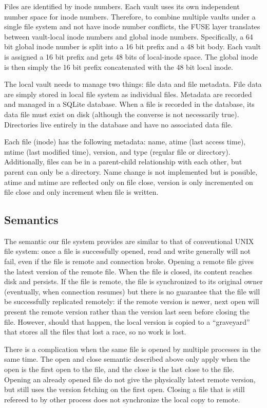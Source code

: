 \documentclass[a4paper,11pt,twoside,twocolumn]{extarticle}
\begin{document}
Files are identified by inode numbers. Each vault uses its own independent number space for inode numbers. Therefore, to combine multiple vaults under a single file system and not have inode number conflicts, the FUSE layer translates between vault-local inode numbers and global inode numbers. Specifically, a 64 bit global inode number is split into a 16 bit prefix and a 48 bit body. Each vault is assigned a 16 bit prefix and gets 48 bits of local-inode space. The global inode is then simply the 16 bit prefix concatenated with the 48 bit local inode.

The local vault needs to manage two things: file data and file metadata. File data are simply stored in local file system as individual files. Metadata are recorded and managed in a SQLite database. When a file is recorded in the database, its data file must exist on disk (although the converse is not necessarily true). Directories live entirely in the database and have no associated data file.

Each file (inode) has the following metadata: name, atime (last access time), mtime (last modified time), version, and type (regular file or directory). Additionally, files can be in a parent-child relationship with each other, but parent can only be a directory. Name change is not implemented but is possible, atime and mtime are reflected only on file close, version is only incremented on file close and only increment when file is written.

\subsection{Semantics}
\label{sec:org6064eac}

The semantic our file system provides are similar to that of conventional UNIX file system: once a file is successfully opened, read and write generally will not fail, even if the file is remote and connection broke. Opening a remote file gives the latest version of the remote file. When the file is closed, its content reaches disk and persists. If the file is remote, the file is synchronized to its original owner (eventually, when connection resumes) but there is no guarantee that the file will be successfully replicated remotely: if the remote version is newer, next open will present the remote version rather than the version last seen before closing the file. However, should that happen, the local version is copied to a “graveyard” that stores all the files that lost a race, so no work is lost.

There is a complication when the same file is opened by multiple processes in the same time. The open and close semantic described above only apply when the open is the first open to the file, and the close is the last close to the file. Opening an already opened file do not give the physically latest remote version, but still uses the version fetching on the first open. Closing a file that is still refereed to by other process does not synchronize the local copy to remote.
\end{document}
